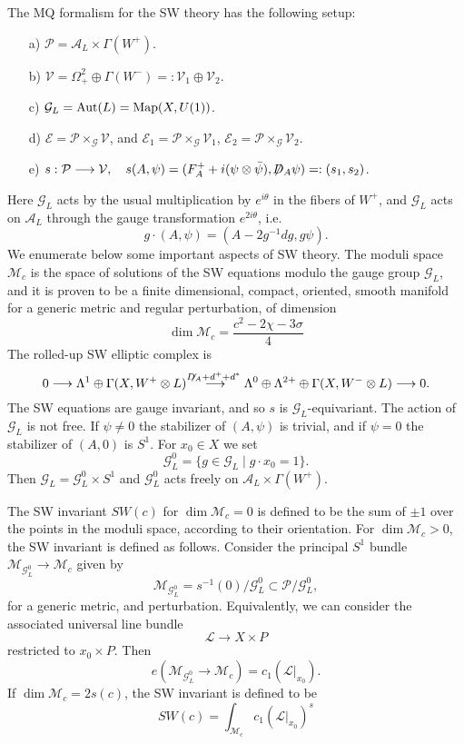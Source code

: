 \documentclass[a4paper,12pt,reqno,sumlimits]{amsart}
\theoremstyle{plain}
\theoremstyle{definition}
\newcommand{\1}{{\bf 1}}
\newcommand{\ex}[1]{{e^{#1}}}
\newcommand{\calA}{{\mathcal A}}
\newcommand{\calE}{{\mathcal E}}
\newcommand{\calG}{{\mathcal G}}
\newcommand{\calM}{{\mathcal M}}
\newcommand{\calP}{{\mathcal P}}
\newcommand{\calL}{{\mathcal L}}
\newcommand{\calV}{{\mathcal V}}
\renewcommand{\to}{\longrightarrow}
\newcommand{\Dirac}{\not\!\!D}
\newcommand{\Map}{\operatorname{Map}}
\newcommand{\inv}{^{-1}}
\numberwithin{equation}{section}
\begin{document}
The MQ formalism for the SW theory has the following setup:
\begin{itemize}
\item[a)] $\calP=\calA_L\times\Gamma(W^+)$.
\item[b)] $\calV=\Omega^2_+\oplus\Gamma(W^-)=:\calV_1\oplus\calV_2$.
\item[c)] $\calG_L=\hbox{Aut}(L)=\Map(X,U(1))$.
\item[d)] $\calE=\calP\times_{\calG}\calV$, and
  $\calE_1=\calP\times_{\calG}\calV_1$, 
  $\calE_2=\calP\times_{\calG}\calV_2$. 
\item[e)] $s:\calP\to\calV,\quad
  s(A,\psi)=(F_A^+ + i(\psi\otimes\bar{\psi}),\Dirac_A\psi)=:(s_1,s_2)$. 
\end{itemize}
Here $\calG_L$ acts by the usual multiplication by $\ex{i\theta}$ in the
fibers of $W^+$, and $\calG_L$ acts on $\calA_L$ through the gauge
transformation $\ex{2i\theta}$, i.e.
$$
g\cdot(A,\psi)=(A-2g\inv dg, g\psi).
$$
We enumerate below some important aspects of SW theory. The moduli space
$\calM_c$ is the space of solutions of the SW equations modulo the gauge
group $\calG_L$, and it is proven to be a finite dimensional, compact,
oriented, smooth manifold for a generic metric and regular perturbation, of
dimension
\begin{equation}
  \label{propdimSW}
  \dim\calM_c=\frac{c^2-2\chi-3\sigma}{4}
\end{equation}
The rolled-up SW elliptic complex is
$$
0\to\Lambda^1\oplus\Gamma(X,W^+\otimes L)\stackrel{\Dirac_A+d^+ +d^*}{\to}
\Lambda^0\oplus\Lambda^{2+}\oplus\Gamma(X,W^-\otimes L)\to 0.
$$
The SW equations are gauge invariant, and so $s$ is $\calG_L$-equivariant.
The action of $\calG_L$ is not free. If $\psi\ne 0$ the stabilizer of
$(A,\psi)$ is trivial, and if $\psi=0$ the stabilizer of $(A,0)$ is $S^1$.
For $x_0\in X$ we set
$$
\calG_L^0=\{g\in\calG_L\mid g\cdot x_0=1\}.
$$
Then $\calG_L=\calG_L^0\times S^1$ and $\calG_L^0$ acts freely on
$\calA_L\times\Gamma(W^+)$.

The SW invariant $SW(c)$ for $\dim\calM_c=0$ is defined to be the sum of $\pm
1$ over the points in the moduli space, according to their orientation.  For
$\dim\calM_c>0$, the SW invariant is defined as follows.  Consider the
principal $S^1$ bundle $\calM_{\calG_L^0}\to\calM_c$ given by
$$
\calM_{\calG_L^0}=s\inv(0)/\calG_L^0\subset\calP/\calG_L^0,
$$
for a generic metric, and perturbation. Equivalently, we can consider the
associated universal line bundle
$$
\calL\to X\times P
$$
restricted to ${x_0}\times P$. Then~\cite{salomon}
$$
e(\calM_{\calG_L^0}\to\calM_c)=c_1(\calL\big|_{x_0}).
$$
If $\dim\calM_c=2s(c)$, the SW invariant is defined to be
$$
SW(c)=\int_{\calM_c} c_1(\calL\big|_{x_0})^s
$$
\end{document}
